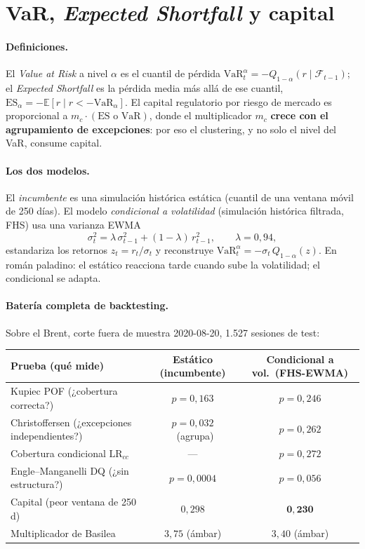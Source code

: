 \documentclass[11pt,a4paper]{article}
\newcommand{\cm}{\textcolor{cGreenD}{\ding{51}}}
\newcommand{\xm}{\textcolor{burgundy}{\ding{55}}}
\begin{document}
\section{VaR, \emph{Expected Shortfall} y capital}
\paragraph{Definiciones.} El \emph{Value at Risk} a nivel $\alpha$ es el cuantil
de pérdida $\mathrm{VaR}^{\alpha}_t=-Q_{1-\alpha}(r\mid\mathcal{F}_{t-1})$; el
\emph{Expected Shortfall} es la pérdida media más allá de ese cuantil,
$\mathrm{ES}_\alpha=-\mathbb{E}[r\mid r<-\mathrm{VaR}_\alpha]$. El capital
regulatorio por riesgo de mercado es proporcional a $m_c\cdot(\text{ES o VaR})$,
donde el multiplicador $m_c$ \textbf{crece con el agrupamiento de excepciones}:
por eso el clustering, y no solo el nivel del VaR, consume capital.

\paragraph{Los dos modelos.} El \emph{incumbente} es una simulación histórica
estática (cuantil de una ventana móvil de 250 días). El modelo \emph{condicional
a volatilidad} (simulación histórica filtrada, FHS) usa una varianza EWMA
\begin{equation}
\sigma_t^2=\lambda\,\sigma_{t-1}^2+(1-\lambda)\,r_{t-1}^2,\qquad \lambda=0{,}94,
\end{equation}
estandariza los retornos $z_t=r_t/\sigma_t$ y reconstruye
$\mathrm{VaR}^{\alpha}_t=-\sigma_t\,Q_{1-\alpha}(z)$. En román paladino: el
estático reacciona tarde cuando sube la volatilidad; el condicional se adapta.

\paragraph{Batería completa de backtesting.} Sobre el Brent, corte fuera de
muestra 2020-08-20, 1.527 sesiones de test:

\begin{table}[H]\centering\footnotesize
\begin{tabularx}{\linewidth}{L c c}
\toprule
Prueba (qué mide) & Estático (incumbente) & Condicional a vol.\ (FHS-EWMA)\\
\midrule
Kupiec POF (¿cobertura correcta?)        & $p=0{,}163$ \cm & $p=0{,}246$ \cm\\
Christoffersen (¿excepciones independientes?)& $p=0{,}032$ \xm\ (agrupa) & $p=0{,}262$ \cm\\
Cobertura condicional $\mathrm{LR}_{cc}$ & --- & $p=0{,}272$ \cm\\
Engle--Manganelli DQ (¿sin estructura?)  & $p=0{,}0004$ \xm & $p=0{,}056$ \cm\\
Capital (peor ventana de 250 d)          & $0{,}298$ & $\mathbf{0{,}230}$\\
Multiplicador de Basilea                 & $3{,}75$ (ámbar) & $3{,}40$ (ámbar)\\
\bottomrule
\end{tabularx}
\end{table}
\end{document}
